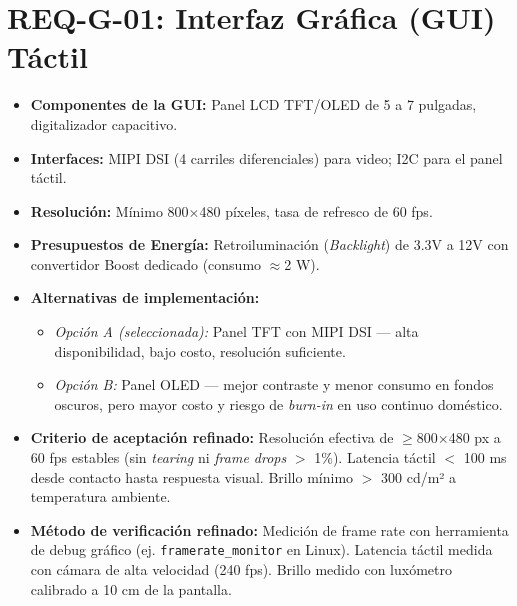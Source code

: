 \documentclass[%
	paper=a4,
	twoside=false,
	parskip=half,
	chapterprefix=false,
	10pt,
	headings=normal,
	bibliography=totoc,
	listof=totoc,
	titlepage=on,
	captions=tableabove,
	draft=false,
]{scrbook}%
\begin{document}
\section{REQ-G-01: Interfaz Gráfica (GUI) Táctil}
\begin{itemize}
    \item \textbf{Componentes de la GUI:} Panel LCD TFT/OLED de 5 a 7 pulgadas, digitalizador capacitivo.
    \item \textbf{Interfaces:} MIPI DSI (4 carriles diferenciales) para video; I2C para el panel táctil.
    \item \textbf{Resolución:} Mínimo 800$\times$480 píxeles, tasa de refresco de 60 fps.
    \item \textbf{Presupuestos de Energía:} Retroiluminación (\textit{Backlight}) de 3.3V a 12V con convertidor Boost dedicado (consumo $\approx$2 W).
    \item \textbf{Alternativas de implementación:}
        \begin{itemize}
            \item \textit{Opción A (seleccionada):} Panel TFT con MIPI DSI — alta disponibilidad, bajo costo, resolución suficiente.
            \item \textit{Opción B:} Panel OLED — mejor contraste y menor consumo en fondos oscuros, pero mayor costo y riesgo de \textit{burn-in} en uso continuo doméstico.
        \end{itemize}
    \item \textbf{Criterio de aceptación refinado:} Resolución efectiva de $\geq$800$\times$480 px a 60 fps estables (sin \textit{tearing} ni \textit{frame drops} $>$ 1\%). Latencia táctil $<$ 100 ms desde contacto hasta respuesta visual. Brillo mínimo $>$ 300 cd/m² a temperatura ambiente.
    \item \textbf{Método de verificación refinado:} Medición de frame rate con herramienta de debug gráfico (ej. \texttt{framerate\_monitor} en Linux). Latencia táctil medida con cámara de alta velocidad (240 fps). Brillo medido con luxómetro calibrado a 10 cm de la pantalla.
\end{itemize}

\end{document}
